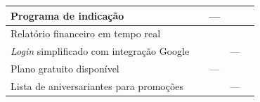 \begin{quadro}[htb]
\begin{tabular}{|p{6.8cm}|c|c|c|c|}
		Programa de indicação  & \checkmark & — & \checkmark & \checkmark \\ \hline
		Relatório financeiro em tempo real    & \checkmark & \checkmark & \checkmark & \checkmark \\ \hline
		\emph{Login} simplificado com integração Google            & \checkmark & \checkmark &  — & \checkmark \\ \hline
		Plano gratuito disponível                                           & \checkmark & — & \checkmark & \checkmark \\ \hline
		Lista de aniversariantes para promoções  & \checkmark & \checkmark & — & \checkmark \\ \hline
		
	\end{tabular}
\end{quadro}
